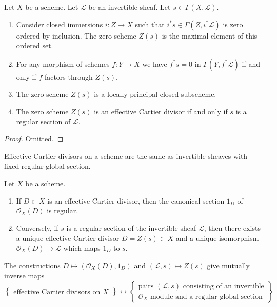 \begin{lemma}
\label{lemma-zero-scheme}
Let $X$ be a scheme.
Let $\mathcal{L}$ be an invertible sheaf.
Let $s \in \Gamma(X, \mathcal{L})$.
\begin{enumerate}
\item Consider closed immersions $i : Z \to X$ such that
$i^*s \in \Gamma(Z, i^*\mathcal{L})$ is zero
ordered by inclusion. The zero scheme $Z(s)$ is the
maximal element of this ordered set.
\item For any morphism of schemes $f : Y \to X$ we have
$f^*s = 0$ in $\Gamma(Y, f^*\mathcal{L})$ if and only if
$f$ factors through $Z(s)$.
\item The zero scheme $Z(s)$ is a locally principal closed subscheme.
\item The zero scheme $Z(s)$ is an effective Cartier divisor
if and only if $s$ is a regular section of $\mathcal{L}$.
\end{enumerate}
\end{lemma}

\begin{proof}
Omitted.
\end{proof}

\begin{lemma}
\label{lemma-characterize-OD}
\begin{slogan}
Effective Cartier divisors on a scheme are the same as invertible sheaves
with fixed regular global section.
\end{slogan}
Let $X$ be a scheme.
\begin{enumerate}
\item If $D \subset X$ is an effective Cartier divisor, then
the canonical section $1_D$ of $\mathcal{O}_X(D)$ is regular.
\item Conversely, if $s$ is a regular section of the invertible
sheaf $\mathcal{L}$, then there exists a unique effective
Cartier divisor $D = Z(s) \subset X$ and a unique isomorphism
$\mathcal{O}_X(D) \to \mathcal{L}$ which maps $1_D$ to $s$.
\end{enumerate}
The constructions
$D \mapsto (\mathcal{O}_X(D), 1_D)$ and $(\mathcal{L}, s) \mapsto Z(s)$
give mutually inverse maps
$$
\left\{
\begin{matrix}
\text{effective Cartier divisors on }X
\end{matrix}
\right\}
\leftrightarrow
\left\{
\begin{matrix}
\text{pairs }(\mathcal{L}, s)\text{ consisting of an invertible}\\
\mathcal{O}_X\text{-module and a regular global section}
\end{matrix}
\right\}
$$
\end{lemma}


